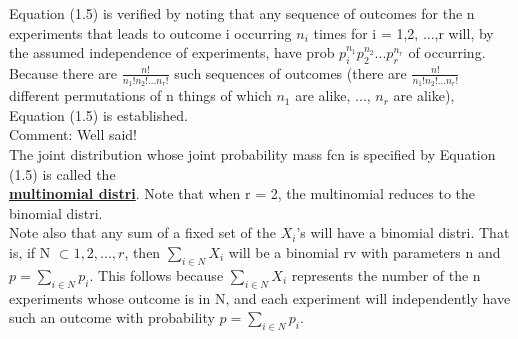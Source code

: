 \documentclass{article}
\begin{document}
Equation (1.5) is verified by noting that any sequence of outcomes for the n experiments that leads to outcome i occurring $n_i$ times for i = 1,2, ...,r will, by the assumed independence of experiments, have prob $p_i^{n_1}p_2^{n_2}...p_r^{n_r}$ of occurring. Because there are $\frac{n!}{n_1!n_2!...n_r!}$ such sequences of outcomes (there are $\frac{n!}{n_1!n_2!...n_r!}$ different permutations of n things of which $n_1$ are alike, ..., $n_r$ are alike), Equation (1.5) is established.\\
Comment: Well said! \\
The joint distribution whose joint probability mass fcn is specified by Equation (1.5) is called the \\
\underline{\textbf{multinomial distri}}. Note that when r = 2, the multinomial reduces to the binomial distri. \\
Note also that any sum of a fixed set of the $X_i$'s will have a binomial distri. That is, if N $\subset {1,2,...,r}$, then $\sum_{i \in N}X_i$ will be a binomial rv with parameters n and $p=\sum_{i \in N} p_i$. This follows because $\sum_{i \in N}X_i$ represents the number of the n experiments whose outcome is in N, and each experiment will independently have such an outcome with probability $p=\sum_{i \in N} p_i$. 
\end{document}
